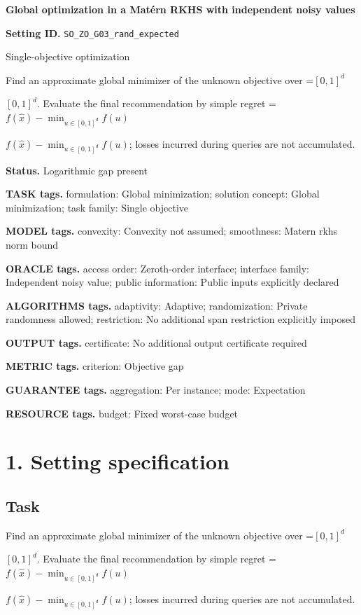 \documentclass[10pt,a4paper]{article}
\newcommand{\AtlasMath}[1]{\par\begingroup\centering\setbox0=\hbox{$\displaystyle #1$}\ifdim\wd0>1.4\linewidth\typeout{ATLAS WIDE FORMULA: \the\wd0}\fi\ifdim\wd0>\linewidth\resizebox{\linewidth}{!}{\box0}\else\box0\fi\par\endgroup}
\newcommand{\AtlasInlineMath}[1]{\begingroup\setbox0=\hbox{$#1$}\ifdim\wd0>.4\linewidth\endgroup\AtlasMath{#1}\else\endgroup$#1$\fi}
\begin{document}
\raggedright

{\LARGE\bfseries\sffamily\color{AtlasNavy} Global optimization in a Matérn RKHS with independent noisy values\par}\vspace{5pt}
\textbf{Setting ID.} \texttt{SO\_\allowbreak{}ZO\_\allowbreak{}G03\_\allowbreak{}rand\_\allowbreak{}expected}

Single-objective optimization

Find an approximate global minimizer of the unknown objective over \AtlasInlineMath{[0,1]^d}. Evaluate the final recommendation by simple regret \AtlasInlineMath{f(\widehat{x})-\min_{u\in [0,1]^d}f(u)}; losses incurred during queries are not accumulated.

\textbf{Status.} Logarithmic gap present

\textbf{TASK tags.} formulation: Global minimization; solution concept: Global minimization; task family: Single objective

\textbf{MODEL tags.} convexity: Convexity not assumed; smoothness: Matern rkhs norm bound

\textbf{ORACLE tags.} access order: Zeroth-order interface; interface family: Independent noisy value; public information: Public inputs explicitly declared

\textbf{ALGORITHMS tags.} adaptivity: Adaptive; randomization: Private randomness allowed; restriction: No additional span restriction explicitly imposed

\textbf{OUTPUT tags.} certificate: No additional output certificate required

\textbf{METRIC tags.} criterion: Objective gap

\textbf{GUARANTEE tags.} aggregation: Per instance; mode: Expectation

\textbf{RESOURCE tags.} budget: Fixed worst-case budget

\section{1. Setting specification}
\subsection{Task}
Find an approximate global minimizer of the unknown objective over \AtlasInlineMath{[0,1]^d}. Evaluate the final recommendation by simple regret \AtlasInlineMath{f(\widehat{x})-\min_{u\in [0,1]^d}f(u)}; losses incurred during queries are not accumulated.
\end{document}
